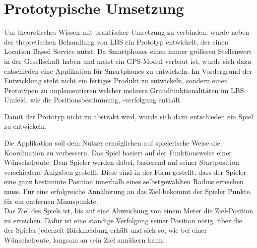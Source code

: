 \newpage
\section{Prototypische Umsetzung}

Um theoretisches Wissen mit praktischer Umsetzung zu verbinden, wurde neben der theoretischen Behandlung von LBS ein Prototyp entwickelt, der einen Location Based Service nutzt. Da Smartphones einen immer größeren Stellenwert in der Gesellschaft haben und meist ein GPS-Modul verbaut ist, wurde sich dazu entschieden eine Applikation für Smartphones zu entwickeln. Im Vordergrund der Entwicklung steht nicht ein fertiges Produkt zu entwickeln, sondern einen Prototypen zu implementieren welcher mehrere Grundfunktionalitäten im LBS Umfeld, wie die Positionsbestimmung, -verfolgung enthält.

Damit der Prototyp nicht zu abstrakt wird, wurde sich dazu entschieden ein Spiel zu entwickeln.


%
%
Die Applikation soll dem Nutzer ermöglichen auf spielerische Weise die Koordination zu verbessern. Das Spiel basiert auf der Funktionsweise einer Wünschelroute. Dem Spieler werden dabei, basierend auf seiner Startposition verschiedene Aufgaben gestellt. Diese sind in der Form gestellt, dass der Spieler eine ganz bestimmte Position innerhalb eines selbstgewählten Radius erreichen muss. Für eine erfolgreiche Annäherung an das Ziel bekommt der Spieler Punkte, für ein entfernen Minuspunkte.
\\
Das Ziel des Spiels ist, bis auf eine Abweichung von einem Meter die Ziel-Position zu erreichen. Dafür ist eine ständige Verfolgung seiner Position nötig, über die der Spieler jederzeit Rückmeldung erhält und sich so, wie bei einer Wünschelroute, langsam an sein Ziel annähern kann.









